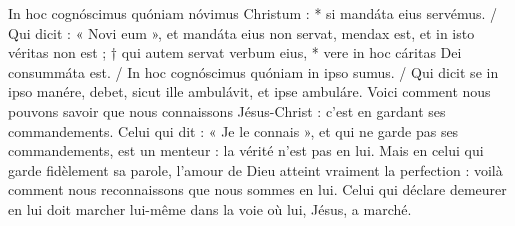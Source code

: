 \documentclass[Session2024.tex]{subfiles}
\begin{document}
{In hoc cognóscimus quóniam nóvimus Christum : * si mandáta eius
servémus. / Qui dicit : « Novi eum », et mandáta eius non servat, mendax
est, et in isto véritas non est ; † qui autem servat verbum eius, * vere in
hoc cáritas Dei consummáta est. / In hoc cognóscimus quóniam in ipso
sumus. / Qui dicit se in ipso manére, debet, sicut ille ambulávit, et ipse
ambuláre.}
{Voici comment nous pouvons savoir que nous connaissons Jésus-Christ :
c’est en gardant ses commandements. Celui qui dit : « Je le connais »,
et qui ne garde pas ses commandements, est un menteur : la vérité n’est
pas en lui. Mais en celui qui garde fidèlement sa parole, l’amour de Dieu
atteint vraiment la perfection : voilà comment nous reconnaissons que
nous sommes en lui. Celui qui déclare demeurer en lui doit marcher lui-même
dans la voie où lui, Jésus, a marché.}


\needspace{3cm}

\needspace{3cm}


\blessing

\end{document}
